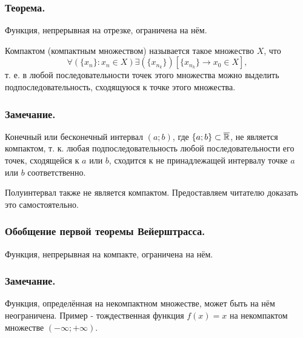 \subsubsection{Теорема.}

Функция, непрерывная на отрезке, ограничена на нём.

\opred

Компактом (компактным множеством) называется такое множество $X$, что
$$
\forall(\{x_n\}:x_n \in X)\exists(\{x_{n_k}\})[\{x_{n_k}\}\to x_0 \in X],
$$ 
т. е. в любой последовательности точек этого множества можно выделить подпоследовательность, сходящуюся к точке этого множества.

\subsubsection{Замечание.}
Конечный или бесконечный интервал $(a;b)$, где $\{a;b\}\subset\overline{\mathbb{R}}$, не является компактом, т. к. любая подпоследовательность любой последовательности его точек, сходящейся к $a$ или $b$, сходится к не принадлежащей интервалу точке $a$ или $b$ соответственно.

Полуинтервал также не является компактом.
Предоставляем читателю доказать это самостоятельно.

\subsubsection{Обобщение первой теоремы Вейерштрасса.}

Функция, непрерывная на компакте, ограничена на нём.

\subsubsection{Замечание.}

Функция, определённая на некомпактном множестве, может быть на нём неограничена. Пример - тождественная функция $f(x)=x$ на некомпактом множестве $(-\infty;+\infty)$.

